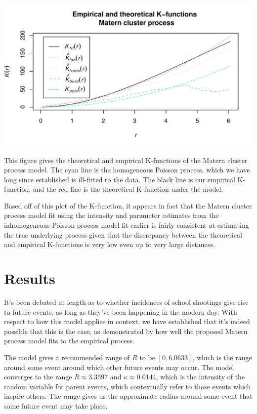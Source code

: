 \documentclass[
  12pt,
]{article}
\begin{document}
\includegraphics{JStevenRaquel_STATS295_Final_files/figure-latex/plot-matern-process-1.pdf}

This figure gives the theoretical and empirical K-functions of the
Matern cluster process model. The cyan line is the homogeneous Poisson
process, which we have long since established is ill-fitted to the data.
The black line is our empirical K-function, and the red line is the
theoretical K-function under the model.

Based off of this plot of the K-function, it appears in fact that the
Matern cluster process model fit using the intensity and parameter
estimates from the inhomogeneous Poisson process model fit earlier is
fairly consistent at estimating the true underlying process given that
the discrepancy between the theoretical and empirical K-functions is
very low even up to very large distances.

\hypertarget{results}{%
\section{Results}\label{results}}

It's been debated at length as to whether incidences of school shootings
give rise to future events, as long as they've been happening in the
modern day. With respect to how this model applies in context, we have
established that it's indeed possible that this is the case, as
demonstrated by how well the proposed Matern process model fits to the
empirical process.

The model gives a recommended range of \(R\) to be \([0, 6.0633]\),
which is the range around some event around which other future events
may occur. The model converges to the range \(R \approx 3.3597\) and
\(\kappa \approx 0.0144\), which is the intensity of the random variable
for parent events, which contextually refer to those events which
inspire others. The range gives us the approximate radius around some
event that some future event may take place.
\end{document}

